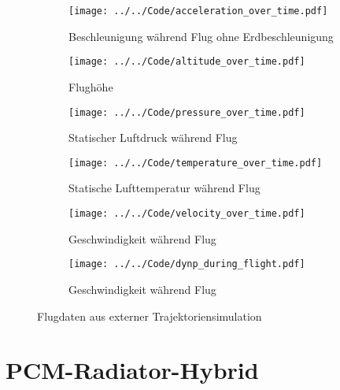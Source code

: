 \begin{figure}[H]
    \centering

    \begin{subfigure}{\textwidth}
        \centering
        \texttt{[image: ../../Code/acceleration\_over\_time.pdf]}
        \caption{Beschleunigung während Flug ohne Erdbeschleunigung}\label{fig:acceleration_over_time}
    \end{subfigure}

    \begin{subfigure}{\textwidth}
        \centering
        \texttt{[image: ../../Code/altitude\_over\_time.pdf]}
        \caption{Flughöhe}\label{fig:altitude_over_time}
    \end{subfigure}

    \begin{subfigure}{\textwidth}
        \centering
        \texttt{[image: ../../Code/pressure\_over\_time.pdf]}
        \caption{Statischer Luftdruck während Flug}\label{fig:pressure_over_time}
    \end{subfigure}

    \begin{subfigure}{\textwidth}
        \centering
        \texttt{[image: ../../Code/temperature\_over\_time.pdf]}
        \caption{Statische Lufttemperatur während Flug}\label{fig:temperature_over_time}
    \end{subfigure}

    \begin{subfigure}{\textwidth}
        \centering
        \texttt{[image: ../../Code/velocity\_over\_time.pdf]}
        \caption{Geschwindigkeit während Flug}\label{fig:velocity_over_time}
    \end{subfigure}

    \begin{subfigure}{\textwidth}
        \centering
        \texttt{[image: ../../Code/dynp\_during\_flight.pdf]}
        \caption{Geschwindigkeit während Flug}\label{fig:dynp_over_time}
    \end{subfigure}

    \caption{Flugdaten aus externer Trajektoriensimulation}
    \label{fig:flight_data_raw}
\end{figure}

\section{PCM-Radiator-Hybrid}\label{sec:pcmRadiatorHybridErgebnisse}

